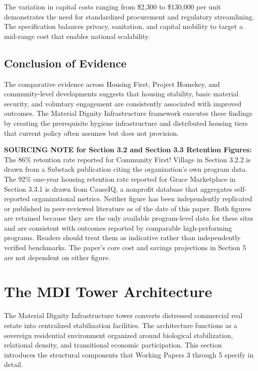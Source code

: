 \documentclass[12pt, letterpaper]{article}
\begin{document}
The variation in capital costs ranging from \$2,300 to \$130,000 per unit demonstrates the need for standardized procurement and regulatory streamlining. The specification balances privacy, sanitation, and capital mobility to target a mid-range cost that enables national scalability.

\subsection{Conclusion of Evidence}

The comparative evidence across Housing First, Project Homekey, and community-level developments suggests that housing stability, basic material security, and voluntary engagement are consistently associated with improved outcomes. The Material Dignity Infrastructure framework executes these findings by creating the prerequisite hygiene infrastructure and distributed housing tiers that current policy often assumes but does not provision.

\noindent\textbf{SOURCING NOTE for Section 3.2 and Section 3.3 Retention Figures:}\\
The 86\% retention rate reported for Community First! Village in Section 3.2.2 is drawn from a Substack publication citing the organization's own program data. The 92\% one-year housing retention rate reported for Grace Marketplace in Section 3.3.1 is drawn from CauseIQ, a nonprofit database that aggregates self-reported organizational metrics. Neither figure has been independently replicated or published in peer-reviewed literature as of the date of this paper. Both figures are retained because they are the only available program-level data for these sites and are consistent with outcomes reported by comparable high-performing programs. Readers should treat them as indicative rather than independently verified benchmarks. The paper's core cost and savings projections in Section 5 are not dependent on either figure.


\section{The MDI Tower Architecture}

The Material Dignity Infrastructure tower converts distressed commercial real estate into centralized stabilization facilities. The architecture functions as a sovereign residential environment organized around biological stabilization, relational density, and transitional economic participation. This section introduces the structural components that Working Papers 3 through 5 specify in detail.
\end{document}
